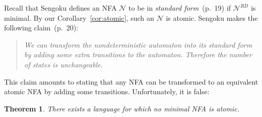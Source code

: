 \documentclass[preprint,12pt]{elsarticle}
\newcommand{\cN}{{\mathcal N}}
\newcommand{\rev}{R}
\newcommand{\deter}{D}
\newtheorem{theorem}{Theorem}
\begin{document}
Recall that Sengoku 
defines an NFA $\cN$ to be in \emph{standard form}~\cite{Sen92}(p.~19) 
if $\cN^{\rev\deter}$ is minimal.
By our Corollary~\ref{cor:atomic}, such an $\cN$ is atomic.
Sengoku makes the following claim~\cite{Sen92}(p.~20):
\begin{quote}
\vskip-0.1cm
\emph{We can transform the nondeterministic automaton into its standard form 
by adding some extra transitions to the automaton. Therefore the number of 
states is unchangeable.}
\end{quote}
\vskip-0.1cm
This claim amounts to stating that any NFA can be transformed to an equivalent  
atomic NFA by adding some transitions. Unfortunately, it is false:
\begin{theorem}
\label{thm:Sengoku}
There exists a language for which no minimal NFA is atomic.
\end{theorem}
\end{document}
